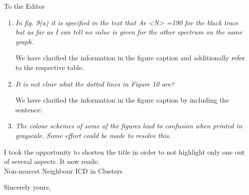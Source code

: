 \documentclass[DIN,pagenumber=false,parskip=half,fromalign=left,fromphone=true,fromemail=true,fromurl=false,fromlogo=false,fromrule=false]{scrlttr2}
\begin{document}
\begin{letter}{To the Editor}
\begin{enumerate}
 \item \emph{In fig. 9(a) it is specified in the text that  Ar <N> =190 for the black trace but as far as I can tell no value is given for the other spectrum on the same graph.}

	We have clarified the information in the figure caption and additionally refer to the respective table.

 \item \emph{It is not clear what the dotted lines in Figure 10 are?}

 We have clarified the information in the figure caption by including the sentence: {\color{blue}{The dotted line shows the unscaled spectrum in this region.}}

 \item \emph{The colour schemes of some of the figures lead to confusion when printed in grayscale. Some effort could be made to resolve this.}

\end{enumerate}


I took the opportunity to shorten the title in order to not highlight only
one out of several aspects. It now reads:\\
      Non-nearest Neighbour ICD in 
      Clusters


        \closing{Sincerely yours,}
	\end{letter}
\end{document}
